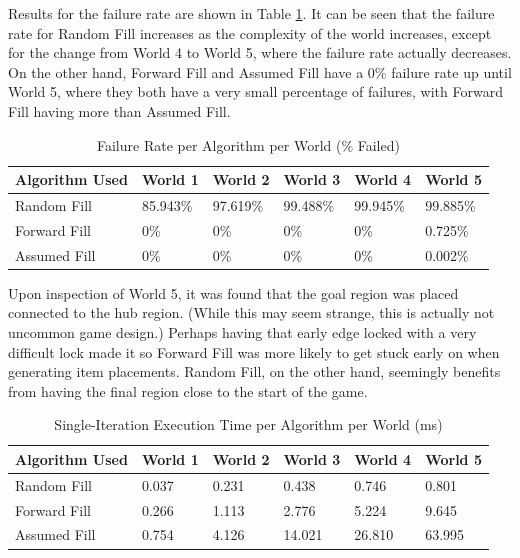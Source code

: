 \documentclass{ieeeaccess}
\begin{document}
Results for the failure rate are shown in Table \ref{table3}. It can be seen that the failure
rate for Random Fill increases as the complexity of the world increases, except for the change
from World 4 to World 5, where the failure rate actually decreases. On the other hand, Forward
Fill and Assumed Fill have a 0\% failure rate up until World 5, where they both have a very
small percentage of failures, with Forward Fill having more than Assumed Fill.

\begin{table}
\caption{Failure Rate per Algorithm per World (\% Failed)}
\label{table3}
\setlength{\tabcolsep}{3pt}
\renewcommand{\arraystretch}{1.2}
\begin{tabular}{ |p{60pt}|p{30pt}|p{30pt}|p{30pt}|p{30pt}|p{30pt}|  }
 \hline
 Algorithm Used & World 1 & World 2 & World 3 & World 4 & World 5\\
 \hline
 Random Fill & 85.943\% & 97.619\% & 99.488\% & 99.945\% & 99.885\% \\
 \hline
 Forward Fill & 0\% & 0\% & 0\% & 0\% & 0.725\% \\
 \hline
 Assumed Fill & 0\% & 0\% & 0\% & 0\% & 0.002\%\\
 \hline
\end{tabular}
\end{table}

Upon inspection of World 5, it was found that the goal region was placed connected to the hub
region. (While this may seem strange, this is actually not uncommon game design.) Perhaps
having that early edge locked with a very difficult lock made it so Forward Fill was more
likely to get stuck early on when generating item placements. Random Fill, on the other hand,
seemingly benefits from having the final region close to the start of the game.

\begin{table}
\caption{Single-Iteration Execution Time per Algorithm per World (ms)}
\label{table4}
\setlength{\tabcolsep}{3pt}
\renewcommand{\arraystretch}{1.2}
\begin{tabular}{ |p{60pt}|p{30pt}|p{30pt}|p{30pt}|p{30pt}|p{30pt}|  }
 \hline
 Algorithm Used & World 1 & World 2 & World 3 & World 4 & World 5\\
 \hline
 Random Fill & 0.037 & 0.231 & 0.438 & 0.746 & 0.801 \\
 \hline
 Forward Fill & 0.266 & 1.113 & 2.776 & 5.224 & 9.645 \\
 \hline
 Assumed Fill & 0.754 & 4.126 & 14.021 & 26.810 & 63.995 \\
 \hline
\end{tabular}
\end{table}
\end{document}
